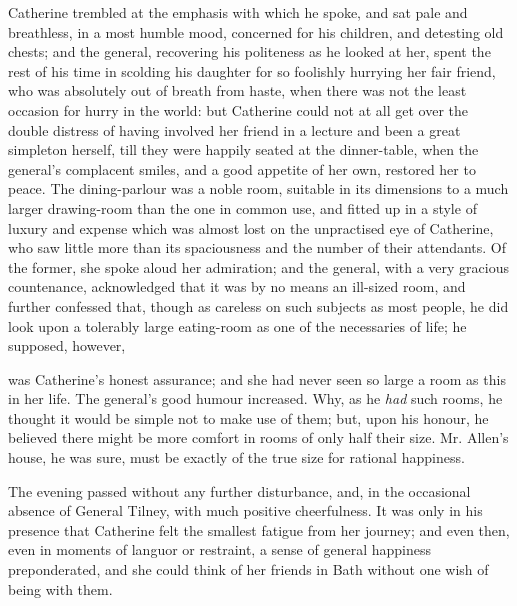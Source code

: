 Catherine trembled at the emphasis with which he spoke, and sat pale and breathless, in a most humble mood, concerned for his children, and detesting old chests; and the general, recovering his politeness as he looked at her, spent the rest of his time in scolding his daughter for so foolishly hurrying her fair friend, who was absolutely out of breath from haste, when there was not the least occasion for hurry in the world: but Catherine could not at all get over the double distress of having involved her friend in a lecture and been a great simpleton herself, till they were happily seated at the dinner-table, when the general's complacent smiles, and a good appetite of her own, restored her to peace. The dining-parlour was a noble room, suitable in its dimensions to a much larger drawing-room than the one in common use, and fitted up in a style of luxury and expense which was almost lost on the unpractised eye of Catherine, who saw little more than its spaciousness and the number of their attendants. Of the former, she spoke aloud her admiration; and the general, with a very gracious countenance, acknowledged that it was by no means an ill-sized room, and further confessed that, though as careless on such subjects as most people, he did look upon a tolerably large eating-room as one of the necessaries of life; he supposed, however, 

 was Catherine's honest assurance;  and she had never seen so large a room as this in her life. The general's good humour increased. Why, as he {\em had} such rooms, he thought it would be simple not to make use of them; but, upon his honour, he believed there might be more comfort in rooms of only half their size. Mr. Allen's house, he was sure, must be exactly of the true size for rational happiness.

The evening passed without any further disturbance, and, in the occasional absence of General Tilney, with much positive cheerfulness. It was only in his presence that Catherine felt the smallest fatigue from her journey; and even then, even in moments of languor or restraint, a sense of general happiness preponderated, and she could think of her friends in Bath without one wish of being with them.

